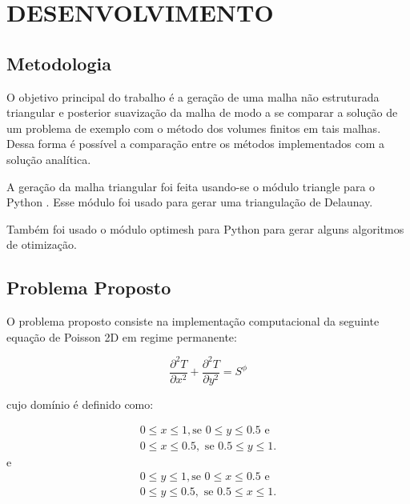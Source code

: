 \chapter[DESENVOLVIMENTO]{DESENVOLVIMENTO}

\section{Metodologia}
O objetivo principal do trabalho é a geração de uma malha não estruturada triangular e posterior suavização da malha de modo a se comparar a solução de um problema de exemplo com o método dos volumes finitos em tais malhas. Dessa forma é possível a comparação entre os métodos implementados com a solução analítica.

A geração da malha triangular foi feita usando-se o módulo triangle para o Python \cite{shewchuk96b}. Esse módulo foi usado para gerar uma triangulação de Delaunay.

Também foi usado o módulo optimesh para Python para gerar alguns algoritmos de otimização.

\section{Problema Proposto}

O problema proposto consiste na implementação computacional da seguinte equação de Poisson 2D em regime permanente:

\begin{equation*}
    \frac{\partial^2 T}{\partial x^2} + \frac{\partial^2 T}{\partial y^2} = S^\phi
\end{equation*}

cujo domínio é definido como:

\begin{equation*}
\begin{split}
    0\leq x \leq 1, \text{se } 0 \leq y \leq 0.5 \text{ e}\\
    0 \leq x \leq 0.5, \text{ se } 0.5 \leq y \leq 1.
\end{split}
\end{equation*}
e
\begin{equation*}
\begin{split}
    0\leq y \leq 1, \text{se } 0 \leq x \leq 0.5 \text{ e}\\
    0 \leq y \leq 0.5, \text{ se } 0.5 \leq x \leq 1.
\end{split}
\end{equation*}

